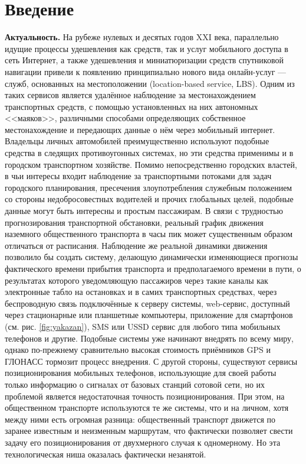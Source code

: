 \chapter{Введение}

{\bf Актуальность.} На рубеже нулевых и десятых годов XXI века, параллельно идущие процессы удешевления как средств, так и услуг мобильного доступа в сеть Интернет, а также удешевления и миниатюризации средств спутниковой навигации привели к появлению принципиально нового вида онлайн-услуг --- служб, основанных на местоположении (location-based service, LBS)\cite{ruwikilbs}. Одним из таких сервисов является удалённое наблюдение за местонахождением транспортных средств, с помощью установленных на них автономных <<маяков>>, различными способами определяющих собственное местонахождение и передающих данные о нём через мобильный интернет. Владельцы личных автомобилей преимущественно используют подобные средства в следящих противоугонных системах\cite{enwikivetrasy}, но эти средства применимы и в городском транспортном хозяйстве. Помимо непосредственно городских властей, в чьи интересы входит наблюдение за транспортными потоками для задач городского планирования, пресечения злоупотребления служебным положением со стороны недобросовестных водителей и прочих глобальных целей, подобные данные могут быть интересны и простым пассажирам. В связи с трудностью прогнозирования транспортной обстановки, реальный график движения наземного общественного транспорта в часы пик может существенным образом отличаться от расписания. Наблюдение же реальной динамики движения позволило бы создать систему, делающую динамически изменяющиеся прогнозы фактического времени прибытия транспорта и предполагаемого времени в пути, о результатах которого уведомляющую пассажиров через такие каналы как электронные табло на остановках и в самих транспортных средствах, через беспроводную связь подключённые к серверу системы, web-сервис, доступный через стационарные или планшетные компьютеры, приложение для смартфонов (см. рис. \ref{fig:yakazan}), SMS или USSD сервис для любого типа мобильных телефонов и другие. Подобные системы уже начинают внедрять по всему миру\cite{itsrapidbus}\cite{spbtrans}\cite{novosib}\cite{yakazan}, однако по-прежнему сравнительно высокая стоимость приёмников GPS и ГЛОНАСС тормозит процесс внедрения. С другой стороны, существуют сервисы позиционирования мобильных телефонов, использующие для своей работы только информацию о сигналах от базовых станций сотовой сети, но их проблемой является недостаточная точность позиционирования. При этом, на общественном транспорте используются те же системы, что и на личном, хотя между ними есть огромная разница: общественный транспорт движется по заранее известным и неизменным маршрутам, что фактически позволяет свести задачу его позиционирования от двухмерного случая к одномерному. Но эта технологическая ниша оказалась фактически незанятой.


